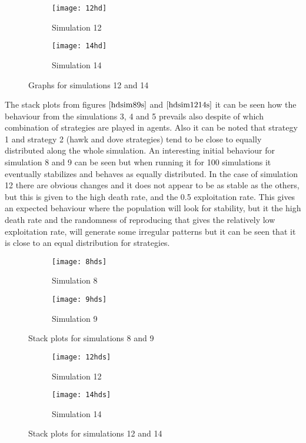 \begin{figure}[H]       
    \centering
    \begin{subfigure}[b]{0.3\textwidth}
	\centering
	{\texttt{[image: 12hd]}}   
    	\caption{Simulation 12}
	\label{fig:hd12}
    \end{subfigure}
    \hfill
    \begin{subfigure}[b]{0.3\textwidth}
	\centering
	{\texttt{[image: 14hd]}}   
    	\caption{Simulation 14}
	\label{fig:hd14}
    \end{subfigure}
   \caption{Graphs for simulations 12 and 14}
    \label{hdsim1214}
\end{figure}

The stack plots from figures $\ref{hdsim89s}$ and $\ref{hdsim1214s}$ it can be seen how the behaviour from the simulations 3, 4 and 5 prevails also despite of which combination of strategies are played in agents. Also it can be noted that strategy 1 and strategy 2 (hawk and dove strategies) tend to be close to equally distributed along the whole simulation. An interesting initial behaviour for simulation 8 and 9 can be seen but when running it for 100 simulations it eventually stabilizes and behaves as equally distributed. In the case of simulation 12 there are obvious changes and it does not appear to be as stable as the others, but this is given to the high death rate, and the 0.5 exploitation rate. This gives an expected behaviour where the population will look for stability, but it the high death rate and the randomness of reproducing that gives the relatively low exploitation rate, will generate some irregular patterns but it can be seen that it is close to an equal distribution for strategies.

\begin{figure}[H]       
    \centering
    \begin{subfigure}[b]{0.3\textwidth}
	\centering
	{\texttt{[image: 8hds]}}   
    	\caption{Simulation 8}
	\label{fig:hd8s}
    \end{subfigure}
    \hfill
    \begin{subfigure}[b]{0.3\textwidth}
	\centering
	{\texttt{[image: 9hds]}}   
    	\caption{Simulation 9}
	\label{fig:hd9s}
    \end{subfigure}
   \caption{Stack plots for simulations 8 and 9}
    \label{hdsim89s}
\end{figure}

\begin{figure}[H]       
    \centering
    \begin{subfigure}[b]{0.3\textwidth}
	\centering
	{\texttt{[image: 12hds]}}   
    	\caption{Simulation 12}
	\label{fig:hd12s}
    \end{subfigure}
    \hfill
    \begin{subfigure}[b]{0.3\textwidth}
	\centering
	{\texttt{[image: 14hds]}}   
    	\caption{Simulation 14}
	\label{fig:hd14s}
    \end{subfigure}
   \caption{Stack plots for simulations 12 and 14}
    \label{hdsim1214s}
\end{figure}

